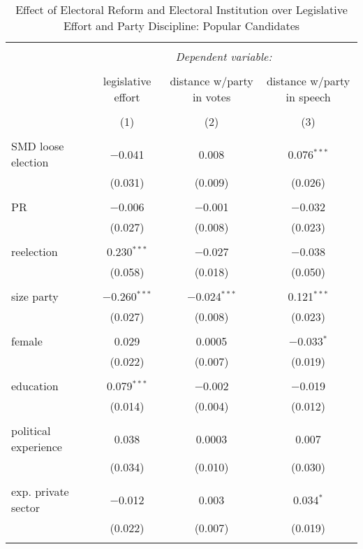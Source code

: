 \documentclass{article}
\begin{document}
\begin{table}[!htbp] \centering 
  \caption{Effect of Electoral Reform and Electoral Institution over Legislative Effort and Party Discipline: Popular Candidates} 
  \label{} 
\begin{tabular}{@{\extracolsep{5pt}}lccc} 
\\[-1.8ex]\hline 
\hline \\[-1.8ex] 
 & \multicolumn{3}{c}{\textit{Dependent variable:}} \\ 
\cline{2-4} 
\\[-1.8ex] & legislative effort & distance w/party in votes & distance w/party in speech \\ 
\\[-1.8ex] & (1) & (2) & (3)\\ 
\hline \\[-1.8ex] 
 SMD loose election & $-$0.041 & 0.008 & 0.076$^{***}$ \\ 
  & (0.031) & (0.009) & (0.026) \\ 
  & & & \\ 
 PR & $-$0.006 & $-$0.001 & $-$0.032 \\ 
  & (0.027) & (0.008) & (0.023) \\ 
  & & & \\ 
 reelection & 0.230$^{***}$ & $-$0.027 & $-$0.038 \\ 
  & (0.058) & (0.018) & (0.050) \\ 
  & & & \\ 
 size party & $-$0.260$^{***}$ & $-$0.024$^{***}$ & 0.121$^{***}$ \\ 
  & (0.027) & (0.008) & (0.023) \\ 
  & & & \\ 
 female & 0.029 & 0.0005 & $-$0.033$^{*}$ \\ 
  & (0.022) & (0.007) & (0.019) \\ 
  & & & \\ 
 education & 0.079$^{***}$ & $-$0.002 & $-$0.019 \\ 
  & (0.014) & (0.004) & (0.012) \\ 
  & & & \\ 
 political experience & 0.038 & 0.0003 & 0.007 \\ 
  & (0.034) & (0.010) & (0.030) \\ 
  & & & \\ 
 exp. private sector & $-$0.012 & 0.003 & 0.034$^{*}$ \\ 
  & (0.022) & (0.007) & (0.019) \\ 
  & & & \\ 

\end{tabular}
\end{table}
\end{document}
